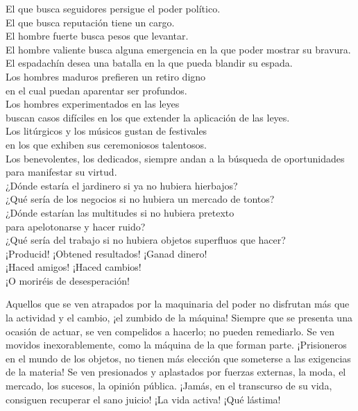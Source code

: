 \documentclass[book,b5paper,hidelinks,final]{memoir}
\begin{document}
	El que busca seguidores persigue el poder político.\\
	El que busca reputación tiene un cargo.\\
	El hombre fuerte busca pesos que levantar.\\
	El hombre valiente busca alguna emergencia en la que poder mostrar su
	bravura.\\
	El espadachín desea una batalla en la que pueda blandir su espada.\\
	Los hombres maduros prefieren un retiro digno\\
	en el cual puedan aparentar ser profundos.\\
	Los hombres experimentados en las leyes\\
	buscan casos difíciles en los que extender la aplicación de las leyes.\\
	Los litúrgicos y los músicos gustan de festivales\\
	en los que exhiben sus ceremoniosos talentosos.\\
	Los benevolentes, los dedicados, siempre andan a la búsqueda de
	oportunidades\\
	para manifestar su virtud.\\
	¿Dónde estaría el jardinero si ya no hubiera hierbajos?\\
	¿Qué sería de los negocios si no hubiera un mercado de tontos?\\
	¿Dónde estarían las multitudes si no hubiera pretexto\\
	para apelotonarse y hacer ruido?\\
	¿Qué sería del trabajo si no hubiera objetos superfluos que hacer?\\
	¡Producid! ¡Obtened resultados! ¡Ganad dinero!\\
	¡Haced amigos! ¡Haced cambios!\\
	¡O moriréis de desesperación!
	
	Aquellos que se ven atrapados por la maquinaria del poder no disfrutan
	más que la actividad y el cambio, ¡el zumbido de la máquina! Siempre que
	se presenta una ocasión de actuar, se ven compelidos a hacerlo; no
	pueden remediarlo. Se ven movidos inexorablemente, como la máquina de la
	que forman parte. ¡Prisioneros en el mundo de los objetos, no tienen más
	elección que someterse a las exigencias de la materia! Se ven
	presionados y aplastados por fuerzas externas, la moda, el mercado, los
	sucesos, la opinión pública. ¡Jamás, en el transcurso de su vida,
	consiguen recuperar el sano juicio! ¡La vida activa! ¡Qué lástima!
	
\end{document}
